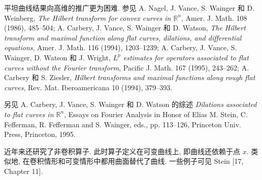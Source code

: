 平坦曲线结果向高维的推广更为困难. 参见 A. Nagel, J. Vance, S. Wainger 和 D. Weinberg, \textit{The Hilbert transform for convex curves in $\mathbb R^n$}, Amer. J. Math. 108 (1986), 485--504; A. Carbery, J. Vance, S. Wainger 和 D. Watson, \textit{The Hilbert transform and maximal function along flat curves, dilations, and differential equations}, Amer. J. Math. 116 (1994), 1203--1239; A. Carbery, J. Vance, S. Wainger, D. Watson 和 J. Wright, \textit{$L^p$ estimates for operators associated to flat curves without the Fourier transform}, Pacific J. Math. 167 (1995), 243--262; A. Carbery 和 S. Ziesler, \textit{Hilbert transforms and maximal functions along rough flat curves}, Rev. Mat. Iberoamericana 10 (1994), 379--393.

\hypertarget{chapter-08-page-206}{}
另见 A. Carbery, J. Vance, S. Wainger 和 D. Watson 的综述 \textit{Dilations associated to flat curves in $\mathbb R^n$}, Essays on Fourier Analysis in Honor of Elias M. Stein, C. Fefferman, R. Fefferman and S. Wainger, eds., pp. 113--126, Princeton Univ. Press, Princeton, 1995.

近年来还研究了非卷积算子. 此时算子定义在可变曲线上, 即曲线还依赖于点 $x$. 类似地, 在卷积情形和可变情形中都用曲面替代了曲线. 一些例子可见 Stein [17, Chapter 11].
